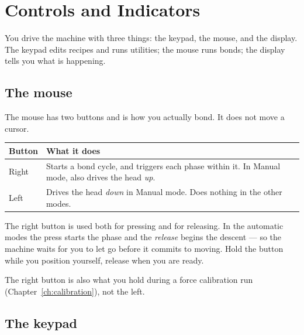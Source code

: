 \chapter{Controls and Indicators}
\label{ch:controls}

You drive the machine with three things: the keypad, the mouse, and the
display. The keypad edits recipes and runs utilities; the mouse runs bonds; the
display tells you what is happening.


\section{The mouse}

The mouse has two buttons and is how you actually bond. It does not move a
cursor.

\begin{center}\small
\begin{tabular}{@{}L{26mm}L{95mm}@{}}
\toprule
\textbf{Button} & \textbf{What it does} \\
\midrule
Right & Starts a bond cycle, and triggers each phase within it. In Manual mode,
        also drives the head \emph{up}. \\
Left  & Drives the head \emph{down} in Manual mode. Does nothing in the other
        modes. \\
\bottomrule
\end{tabular}
\end{center}

\begin{wbnote}
The right button is used both for pressing and for releasing. In the automatic
modes the press starts the phase and the \emph{release} begins the descent ---
so the machine waits for you to let go before it commits to moving. Hold the
button while you position yourself, release when you are ready.
\end{wbnote}

\begin{wbnote}
The right button is also what you hold during a force calibration run
(Chapter~\ref{ch:calibration}), not the left.
\end{wbnote}

\section{The keypad}

